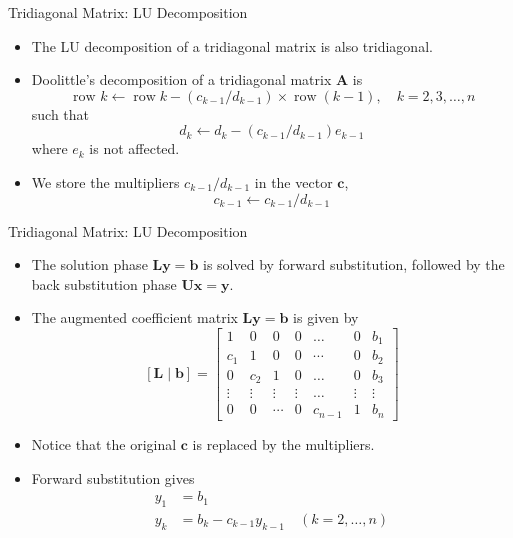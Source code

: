 \documentclass{beamer}
\begin{document}
\begin{frame}{Tridiagonal  Matrix: LU Decomposition}
\begin{itemize}
\item The LU decomposition of a tridiagonal matrix is also tridiagonal.
\item Doolittle's decomposition of a tridiagonal matrix $\mathbf{A}$ is 
$$
\text { row } k \leftarrow \operatorname{row} k-\left(c_{k-1} / d_{k-1}\right) \times \operatorname{row}(k-1), \quad k=2,3, \ldots, n
$$
such that 
$$
d_k \leftarrow d_k-\left(c_{k-1} / d_{k-1}\right) e_{k-1}
$$
where $e_k$ is not affected. 
\item We store the multipliers $c_{k-1} / d_{k-1}$ in the vector $\mathbf{c}$, 
$$
c_{k-1} \leftarrow c_{k-1} / d_{k-1}
$$
\end{itemize}
\end{frame}

\begin{frame}{Tridiagonal  Matrix: LU Decomposition}
  \begin{itemize}
  \item The solution phase $\mathbf{L}\mathbf{y}=\mathbf{b}$ is solved by forward substitution, followed by the back substitution phase $\mathbf{U}\mathbf{x}=\mathbf{y}$.

\item  The augmented coefficient matrix $\mathbf{L}\mathbf{y}=\mathbf{b}$ is given by 
$$
[\mathbf{L} \mid \mathbf{b}]=\left[\begin{array}{cccccc|c}
1 & 0 & 0 & 0 & \ldots & 0 & b_1 \\
c_1 & 1 & 0 & 0 & \cdots & 0 & b_2 \\
0 & c_2 & 1 & 0 & \ldots & 0 & b_3 \\
\vdots & \vdots & \vdots & \vdots & \ldots & \vdots & \vdots \\
0 & 0 & \cdots & 0 & c_{n-1} & 1 & b_n
\end{array}\right]
$$
\item Notice that the original $\mathbf{c}$ is replaced by the multipliers.
\item Forward substitution gives
\begin{align*}
y_1&=b_1\\
y_k&=b_k-c_{k-1}y_{k-1} \quad  (k=2,\ldots,n)
\end{align*}

\end{itemize}
\end{frame}
\end{document}
